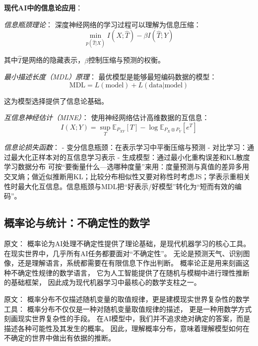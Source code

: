 \textbf{现代AI中的信息论应用}：

\textit{信息瓶颈理论}：
深度神经网络的学习过程可以理解为信息压缩：
$$\min_{p(\hat{T}|X)} I(X; \hat{T}) - \beta I(\hat{T}; Y)$$

其中$\hat{T}$是网络的隐藏表示，$\beta$控制压缩与预测的权衡。

\textit{最小描述长度（MDL）原理}：
最优模型是能够最短编码数据的模型：
$$\text{MDL} = L(\text{model}) + L(\text{data}|\text{model})$$

这为模型选择提供了信息论基础。

\textit{互信息神经估计（MINE）}：
使用神经网络估计高维数据的互信息：
$$I(X;Y) = \sup_{T} \mathbb{E}_{P_{XY}}[T] - \log \mathbb{E}_{P_X \otimes P_Y}[e^T]$$

\textit{信息论损失函数}：
- 变分信息瓶颈：在表示学习中平衡压缩与预测
- 对比学习：通过最大化正样本对的互信息学习表示
- 生成模型：通过最小化重构误差和KL散度学习数据分布
可按“要衡量什么—选哪种度量”来用：度量预测与真值的差异多用交叉熵；做近似推断用KL；比较分布相似性又要对称性时考虑JS；学表示重相关性时最大化互信息。信息瓶颈与MDL把“好表示/好模型”转化为“短而有效的编码”。


\subsection{概率论与统计：不确定性的数学}

原文：
概率论为AI处理不确定性提供了理论基础，是现代机器学习的核心工具。
在现实世界中，几乎所有AI任务都要面对“不确定性”。  
无论是预测天气、识别图像，还是理解语言，系统都需要在有限信息下作出判断。  
概率论正是用来刻画这种不确定性规律的数学语言，  
它为人工智能提供了在随机与模糊中进行理性推断的基础框架，  
因此成为现代机器学习中最核心的数学支柱之一。



原文：
概率分布不仅描述随机变量的取值规律，更是建模现实世界复杂性的数学工具：
概率分布不仅仅是一种对随机变量取值规律的描述，  
更是一种用数学方式刻画现实世界复杂性的手段。  
在AI模型中，我们并不追求绝对确定的答案，而是描述各种可能性及其发生的概率。  
因此，理解概率分布，意味着理解模型如何在不确定的世界中做出有依据的推断。



